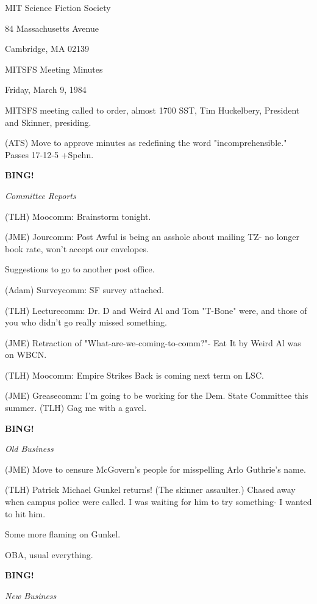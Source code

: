 \documentclass[12pt]{article}
\newcommand{\bing}{{\bf BING!} }
\newcommand{\goto}[1]{\bing \vskip 12pt \centerline{{\em{#1}}}}
\begin{document}
\begin{center}

MIT Science Fiction Society 

84 Massachusetts Avenue

Cambridge, MA 02139

\vspace{12pt}

MITSFS Meeting Minutes 

Friday, March 9, 1984

\end{center}
 
\vspace{18pt}

\setlength{\parskip}{6pt}

\noindent
MITSFS meeting called to order, almost 1700 SST,
Tim Huckelbery, President and Skinner, presiding.

(ATS) Move to approve minutes as redefining the word "incomprehensible." Passes 17-12-5 +Spehn.

\goto{Committee Reports}

(TLH) Moocomm: Brainstorm tonight.

(JME) Jourcomm: Post Awful is being an asshole about mailing TZ- no longer book rate, won't accept our envelopes.

Suggestions to go to another post office.

(Adam) Surveycomm: SF survey attached.

(TLH) Lecturecomm: Dr. D and Weird Al and Tom "T-Bone" were, and those of you who didn't go really missed something.

(JME) Retraction of "What-are-we-coming-to-comm?"- Eat It by Weird Al was on WBCN.

(TLH) Moocomm: Empire Strikes Back is coming next term on LSC.

(JME) Greasecomm: I'm going to be working for the Dem. State Committee this summer. (TLH) Gag me with a gavel.

\goto{Old Business}

(JME) Move to censure McGovern's people for misspelling Arlo Guthrie's name.

(TLH) Patrick Michael Gunkel returns! (The skinner assaulter.) Chased away when campus police were called. I was waiting for him to try something- I wanted to hit him.

Some more flaming on Gunkel.

OBA, usual everything.

\goto{New Business}
\end{document}
